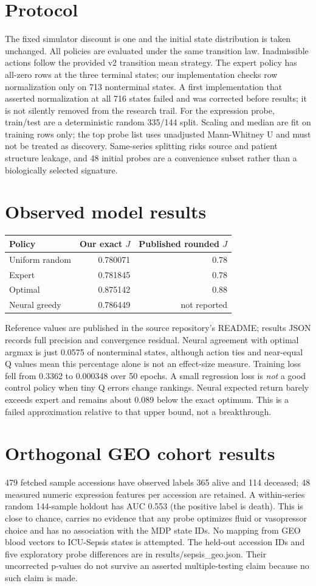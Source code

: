 \section{Protocol}
The fixed simulator discount is one and the initial state distribution is taken unchanged. All policies are evaluated under the same transition law. Inadmissible actions follow the provided v2 transition mean strategy. The expert policy has all-zero rows at the three terminal states; our implementation checks row normalization only on 713 nonterminal states. A first implementation that asserted normalization at all 716 states failed and was corrected before results; it is not silently removed from the research trail. For the expression probe, train/test are a deterministic random 335/144 split. Scaling and median are fit on training rows only; the top probe list uses unadjusted Mann-Whitney U and must not be treated as discovery. Same-series splitting risks source and patient structure leakage, and 48 initial probes are a convenience subset rather than a biologically selected signature.
\section{Observed model results}
\begin{center}\begin{tabular}{lrr}\toprule Policy&Our exact $J$&Published rounded $J$\\\midrule Uniform random&0.780071&0.78\\Expert&0.781845&0.78\\Optimal&0.875142&0.88\\Neural greedy&0.786449&not reported\\\bottomrule\end{tabular}\end{center}
Reference values are published in the source repository's README; results JSON records full precision and convergence residual. Neural agreement with optimal argmax is just 0.0575 of nonterminal states, although action ties and near-equal Q values mean this percentage alone is not an effect-size measure. Training loss fell from 0.3362 to 0.000348 over 50 epochs. A small regression loss is \emph{not} a good control policy when tiny Q errors change rankings. Neural expected return barely exceeds expert and remains about 0.089 below the exact optimum. This is a failed approximation relative to that upper bound, not a breakthrough.
\section{Orthogonal GEO cohort results}
479 fetched sample accessions have observed labels 365 alive and 114 deceased; 48 measured numeric expression features per accession are retained. A within-series random 144-sample holdout has AUC 0.553 (the positive label is death). This is close to chance, carries no evidence that any probe optimizes fluid or vasopressor choice and has no association with the MDP state IDs. No mapping from GEO blood vectors to ICU-Sepsis states is attempted. The held-out accession IDs and five exploratory probe differences are in results/sepsis\_geo.json. Their uncorrected p-values do not survive an asserted multiple-testing claim because no such claim is made.
